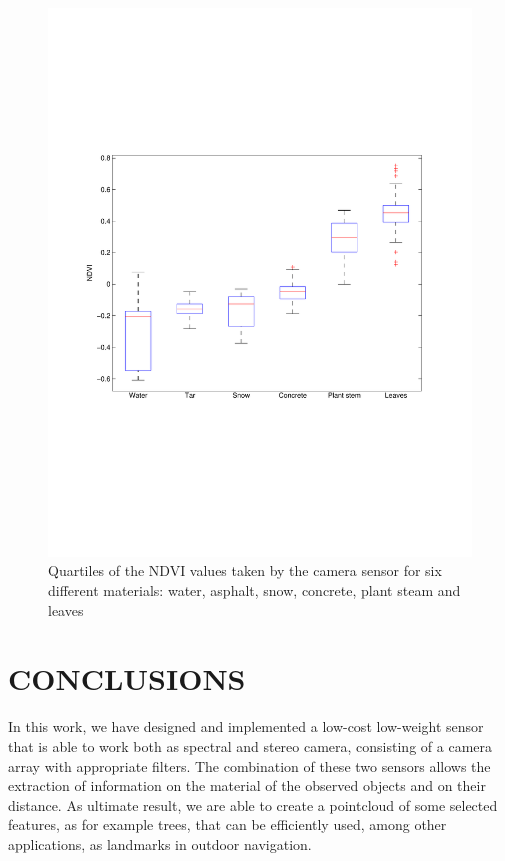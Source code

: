 \documentclass[a4paper, 10pt, conference]{ieeeconf}      %
\begin{document}
\begin{figure}[t]
      \centering
      \includegraphics[trim = 1mm 75mm 1mm 75mm, clip,width=0.99\linewidth]{../images/experiment/boxplot_database.pdf}
      \caption{Quartiles of the NDVI values taken by the camera sensor for six different materials: water, asphalt, snow, concrete, plant steam and leaves}
       \label{fig:boxplot}
   \end{figure}

 

\section{CONCLUSIONS}\label{sec:conclusions}

In this work, we have designed and implemented a low-cost low-weight sensor that is able to work both as spectral and stereo camera, consisting of a camera array with appropriate filters.
The combination of these two sensors allows the extraction of information on the material of the observed objects and on their distance.
As ultimate result, we are able to create a pointcloud of some selected features, as for example trees,  that can be efficiently used, among other applications, as landmarks in outdoor navigation.
\end{document}
